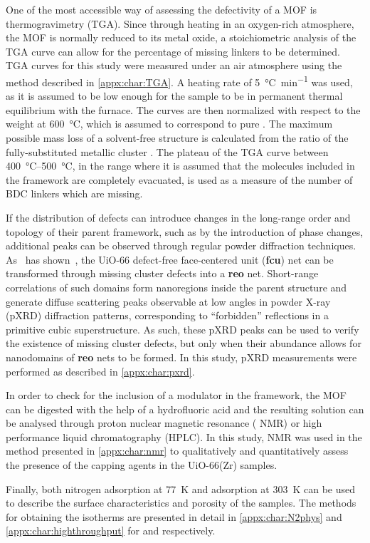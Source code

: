 One of the most accessible way of assessing the defectivity of
a MOF is thermogravimetry (TGA). Since through heating in
an oxygen-rich atmosphere, the MOF is normally reduced to
its metal oxide, a stoichiometric analysis of the TGA curve
can allow for the percentage of missing linkers to be
determined. TGA curves for this study were measured under
an air atmosphere using the method described in \autoref{appx:char:TGA}.
A heating rate of \SI{5}{\degreeCelsius\per\minute} was used,
as it is assumed to be low enough for the sample to be in
permanent thermal equilibrium with the furnace.
The curves are then normalized with respect to the weight at
\SI{600}{\degreeCelsius}, which is assumed to correspond to pure
. The maximum possible mass loss of a solvent-free
structure is calculated from the ratio of the fully-substituted
metallic cluster . The plateau
of the TGA curve between \SIrange{400}{500}{\degreeCelsius},
in the range where it is assumed that the molecules included in
the framework are completely evacuated, is used as a measure of the
number of BDC linkers which are missing.

If the distribution of defects can introduce changes in the
long-range order and topology of their parent framework,
such as by the introduction of phase changes,
additional peaks can be observed through regular
powder diffraction techniques.
As~\citeauthor{cliffeCorrelatedDefectNanoregions2014} has
shown~\cite{cliffeCorrelatedDefectNanoregions2014},
the UiO-66 defect-free face-centered unit (\textbf{fcu})
net can be transformed through missing cluster defects into
a \textbf{reo} net. Short-range correlations of such domains
form nanoregions inside the parent structure and generate
diffuse scattering peaks observable at low angles in
powder X-ray (pXRD) diffraction patterns, corresponding to ``forbidden''
reflections in a primitive cubic superstructure.
As such, these pXRD peaks can be used to verify the existence of
missing cluster defects, but only when their abundance allows for
nanodomains of \textbf{reo} nets to be formed. In this study,
pXRD measurements were performed as described in \autoref{appx:char:pxrd}.

In order to check for the inclusion of a modulator in the framework,
the MOF can be digested with the help of a hydrofluoric acid and the
resulting solution can be analysed through proton nuclear magnetic 
resonance ( NMR) or high performance liquid chromatography
(HPLC). In this study,  NMR was used in the method presented
in \autoref{appx:char:nmr} to qualitatively and quantitatively assess
the presence of the capping agents in the UiO-66(Zr) samples. 

Finally, both nitrogen adsorption at \SI{77}{\kelvin} and  
adsorption at \SI{303}{\kelvin} can be used to describe the surface 
characteristics and porosity of the samples. The methods for obtaining
the isotherms are presented in detail in \autoref{appx:char:N2phys}
and \autoref{appx:char:highthroughput} for  and 
respectively.
